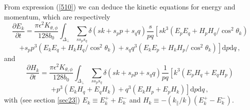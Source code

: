 \documentclass{jpp}
\def\be{\begin{equation}}
\def\ee{\end{equation}}
\def\dd{\mathrm{d}}
\begin{document}
From expression (\ref{510}) we can deduce the kinetic equations for energy and momentum, which are respectively
\be \label{kinE}
\frac{\partial E_k}{\partial t} = 
\frac{\pi \epsilon^{2} K_{\theta,\phi}}{128 b_0} \int_{\Delta_\perp} \sum_{ss_{p} s_{q}}  
\delta(sk+s_pp+s_qq)\frac{s}{pq} 
\left[ sk^3 \left( E_p E_q + H_p H_q / \cos^2 \theta_k \right) \right.
\ee
$$
\left. + s_p p^3 \left(E_k E_q + H_k H_q/ \cos^2 \theta_k \right)
+ s_q q^3 \left(E_k E_p + H_k H_p/ \cos^2 \theta_k \right)
\right]  \dd p \dd q \, ,  
$$
and 
\be \label{kinH}
\frac{\partial H_k}{\partial t} = 
\frac{\pi \epsilon^{2} K_{\theta,\phi}}{128 b_0} \int_{\Delta_\perp} \sum_{ss_{p} s_{q}}  
\delta(sk+s_pp+s_qq)\frac{1}{pq} 
\left[ k^3 \left( E_p H_q + E_q H_p \right) \right.
\ee
$$
\left. + p^3 \left(E_k H_q + E_q H_k \right) + q^3 \left(E_k H_p + E_p H_k \right)
\right]  \dd p \dd q \, ,  
$$
with (see section \ref{sec23}) $E_k \equiv E_k^+ + E_k^-$ and $H_k \equiv - (k_\parallel / k) (E_k^+ - E_k^-)$. 


\end{document}
